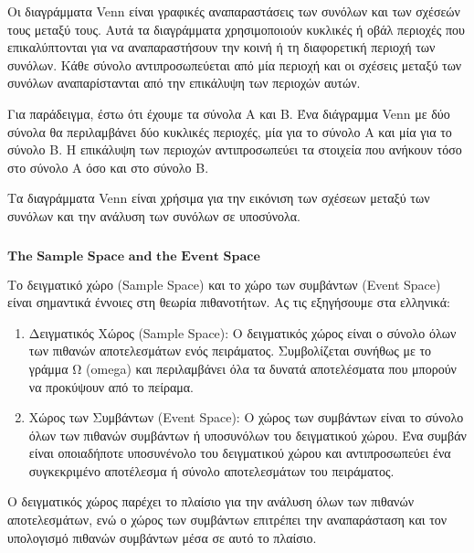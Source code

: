 \documentclass[11pt]{article}
\makeatletter
\newcommand{\boxspacing}{\kern\kvtcb@left@rule\kern\kvtcb@boxsep}
\newcommand{\prompt}[4]{
        {\ttfamily\llap{{\color{#2}[#3]:\hspace{3pt}#4}}\vspace{-\baselineskip}}
    }
\makeatother
\begin{document}
Οι διαγράμματα Venn είναι γραφικές αναπαραστάσεις των συνόλων και των
σχέσεών τους μεταξύ τους. Αυτά τα διαγράμματα χρησιμοποιούν κυκλικές ή
οβάλ περιοχές που επικαλύπτονται για να αναπαραστήσουν την κοινή ή τη
διαφορετική περιοχή των συνόλων. Κάθε σύνολο αντιπροσωπεύεται από μία
περιοχή και οι σχέσεις μεταξύ των συνόλων αναπαρίστανται από την
επικάλυψη των περιοχών αυτών.

Για παράδειγμα, έστω ότι έχουμε τα σύνολα Α και Β. Ένα διάγραμμα Venn με
δύο σύνολα θα περιλαμβάνει δύο κυκλικές περιοχές, μία για το σύνολο Α
και μία για το σύνολο Β. Η επικάλυψη των περιοχών αντιπροσωπεύει τα
στοιχεία που ανήκουν τόσο στο σύνολο Α όσο και στο σύνολο Β.

Τα διαγράμματα Venn είναι χρήσιμα για την εικόνιση των σχέσεων μεταξύ
των συνόλων και την ανάλυση των συνόλων σε υποσύνολα.

    \begin{tcolorbox}[breakable, size=fbox, boxrule=1pt, pad at break*=1mm,colback=cellbackground, colframe=cellborder]
\prompt{In}{incolor}{ }{\boxspacing}
\begin{Verbatim}[commandchars=\\\{\}]

\end{Verbatim}
\end{tcolorbox}

    \(\textbf{The Sample Space and the Event Space}\)

    Το δειγματικό χώρο (Sample Space) και το χώρο των συμβάντων (Event
Space) είναι σημαντικά έννοιες στη θεωρία πιθανοτήτων. Ας τις εξηγήσουμε
στα ελληνικά:

\begin{enumerate}
\def\labelenumi{\arabic{enumi}.}
\item
  Δειγματικός Χώρος (Sample Space): Ο δειγματικός χώρος είναι ο σύνολο
  όλων των πιθανών αποτελεσμάτων ενός πειράματος. Συμβολίζεται συνήθως
  με το γράμμα Ω (omega) και περιλαμβάνει όλα τα δυνατά αποτελέσματα που
  μπορούν να προκύψουν από το πείραμα.
\item
  Χώρος των Συμβάντων (Event Space): Ο χώρος των συμβάντων είναι το
  σύνολο όλων των πιθανών συμβάντων ή υποσυνόλων του δειγματικού χώρου.
  Ένα συμβάν είναι οποιαδήποτε υποσυνένολο του δειγματικού χώρου και
  αντιπροσωπεύει ένα συγκεκριμένο αποτέλεσμα ή σύνολο αποτελεσμάτων του
  πειράματος.
\end{enumerate}

Ο δειγματικός χώρος παρέχει το πλαίσιο για την ανάλυση όλων των πιθανών
αποτελεσμάτων, ενώ ο χώρος των συμβάντων επιτρέπει την αναπαράσταση και
τον υπολογισμό πιθανών συμβάντων μέσα σε αυτό το πλαίσιο.
\end{document}
